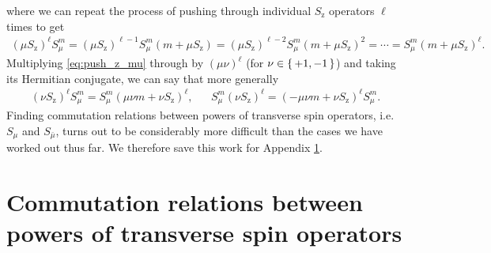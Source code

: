 \documentclass[aps,pra,twocolumn,longbibliography]{revtex4-2}
\newcommand{\p}[1]{\left( #1 \right)} %
\newcommand{\z}{\text{z}}
\newcommand{\bmu}{{\bar\mu}}
\newcommand{\1}{\mathds{1}}
\begin{document}
where we can repeat the process of pushing through individual $S_\z$
operators $\ell$ times to get
\begin{align}
  \p{\mu S_\z}^\ell S_\mu^m
  = \p{\mu S_\z}^{\ell-1} S_\mu^m \p{m + \mu S_\z}
  = \p{\mu S_\z}^{\ell-2} S_\mu^m \p{m + \mu S_\z}^2
  = \cdots
  = S_\mu^m \p{m + \mu S_\z}^\ell.
  \label{eq:push_z_mu}
\end{align}
Multiplying \eqref{eq:push_z_mu} through by $\p{\mu\nu}^\ell$ (for
$\nu\in\set{+1,-1}$) and taking its Hermitian conjugate, we can say
that more generally
\begin{align}
  \p{\nu S_\z}^\ell S_\mu^m
  = S_\mu^m \p{\mu\nu m+\nu S_\z}^\ell,
  &&
  S_\mu^m \p{\nu S_\z}^\ell
  = \p{-\mu\nu m+\nu S_\z}^\ell S_\mu^m.
\end{align}
Finding commutation relations between powers of transverse spin
operators, i.e.~$S_\mu$ and $S_\bmu$, turns out to be considerably
more difficult than the cases we have worked out thus far.  We
therefore save this work for Appendix \ref{sec:comm_transverse}.

\section{Commutation relations between powers of transverse spin
  operators}
\label{sec:comm_transverse}
\end{document}
